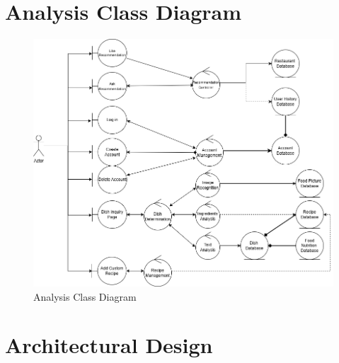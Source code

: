 \documentclass[]{article}
\begin{document}

\section{Analysis Class Diagram}
\label{sec:analysis_class_diagram}
\begin{figure}[H]
    \centering
    \includegraphics[width=\textwidth]{image/D2_2_analysis_class_diagram.png}
    \caption{Analysis Class Diagram}
\end{figure}


\section{Architectural Design}
\label{sec:architectural_design}
\end{document}
